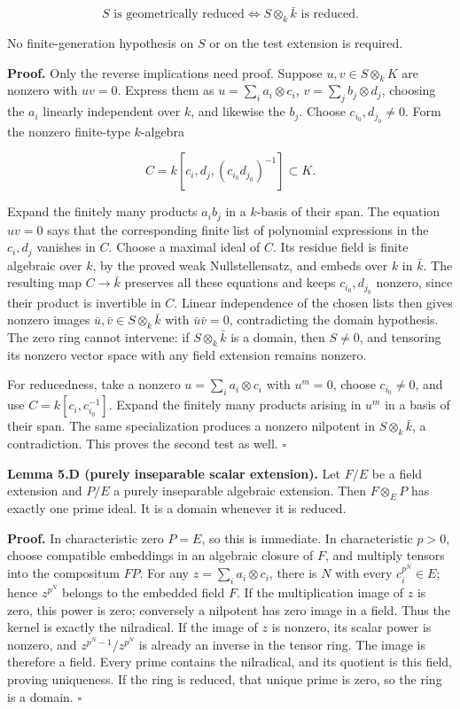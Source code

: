 \documentclass[
]{article}
\begin{document}
\[
S\text{ is geometrically reduced}
\Longleftrightarrow S\otimes_k\bar k\text{ is reduced}.
\]

No finite-generation hypothesis on \(S\) or on the test extension is
required.

\textbf{Proof.} Only the reverse implications need proof. Suppose
\(u,v\in S\otimes_k K\) are nonzero with \(uv=0\). Express them as
\(u=\sum_i a_i\otimes c_i\), \(v=\sum_j b_j\otimes d_j\), choosing the
\(a_i\) linearly independent over \(k\), and likewise the \(b_j\).
Choose \(c_{i_0},d_{j_0}\ne0\). Form the nonzero finite-type
\(k\)-algebra

\[
C=k[c_i,d_j,(c_{i_0}d_{j_0})^{-1}]\subset K.
\]

Expand the finitely many products \(a_ib_j\) in a \(k\)-basis of their
span. The equation \(uv=0\) says that the corresponding finite list of
polynomial expressions in the \(c_i,d_j\) vanishes in \(C\). Choose a
maximal ideal of \(C\). Its residue field is finite algebraic over
\(k\), by the proved weak Nullstellensatz, and embeds over \(k\) in
\(\bar k\). The resulting map \(C\to\bar k\) preserves all these
equations and keeps \(c_{i_0},d_{j_0}\) nonzero, since their product is
invertible in \(C\). Linear independence of the chosen lists then gives
nonzero images \(\bar u,\bar v\in S\otimes_k\bar k\) with
\(\bar u\bar v=0\), contradicting the domain hypothesis. The zero ring
cannot intervene: if \(S\otimes_k\bar k\) is a domain, then \(S\ne0\),
and tensoring its nonzero vector space with any field extension remains
nonzero.

For reducedness, take a nonzero \(u=\sum_i a_i\otimes c_i\) with
\(u^m=0\), choose \(c_{i_0}\ne0\), and use \(C=k[c_i,c_{i_0}^{-1}]\).
Expand the finitely many products arising in \(u^m\) in a basis of their
span. The same specialization produces a nonzero nilpotent in
\(S\otimes_k\bar k\), a contradiction. This proves the second test as
well. \(\square\)

\textbf{Lemma 5.D (purely inseparable scalar extension).} Let \(F/E\) be
a field extension and \(P/E\) a purely inseparable algebraic extension.
Then \(F\otimes_E P\) has exactly one prime ideal. It is a domain
whenever it is reduced.

\textbf{Proof.} In characteristic zero \(P=E\), so this is immediate. In
characteristic \(p>0\), choose compatible embeddings in an algebraic
closure of \(F\), and multiply tensors into the compositum \(FP\). For
any \(z=\sum_i a_i\otimes c_i\), there is \(N\) with every
\(c_i^{p^N}\in E\); hence \(z^{p^N}\) belongs to the embedded field
\(F\). If the multiplication image of \(z\) is zero, this power is zero;
conversely a nilpotent has zero image in a field. Thus the kernel is
exactly the nilradical. If the image of \(z\) is nonzero, its scalar
power is nonzero, and \(z^{p^N-1}/z^{p^N}\) is already an inverse in the
tensor ring. The image is therefore a field. Every prime contains the
nilradical, and its quotient is this field, proving uniqueness. If the
ring is reduced, that unique prime is zero, so the ring is a domain.
\(\square\)
\end{document}
